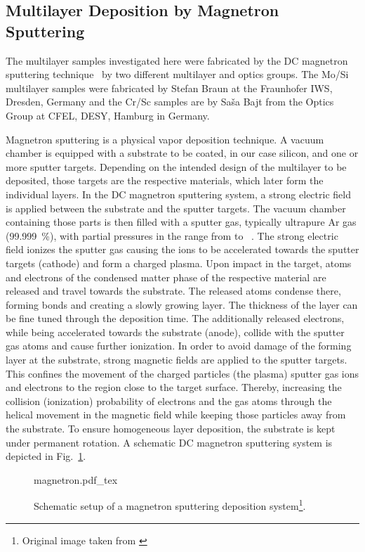 \subsection{Multilayer Deposition by Magnetron Sputtering} \label{ch_exp:sec_magnetron_sputtering}
The multilayer samples investigated here were fabricated by the DC magnetron sputtering technique~\cite{stearns_fabrication_1991} by two different multilayer and optics groups. The Mo/Si multilayer samples were fabricated by Stefan Braun at the Fraunhofer IWS, Dresden, Germany and the Cr/Sc samples are by Sa\v{s}a Bajt from the Optics Group at CFEL, DESY, Hamburg in Germany.

Magnetron sputtering is a physical vapor deposition technique. A vacuum chamber is equipped with a substrate to be coated, in our case silicon, and one or more sputter targets. Depending on the intended design of the multilayer to be deposited, those targets are the respective materials, which later form the individual layers. In the DC magnetron sputtering system, a strong electric field is applied between the substrate and the sputter targets. The vacuum chamber containing those parts is then filled with a sputter gas, typically ultrapure Ar gas (\SI{99.999}{\percent}), with partial pressures in the range from  to ~\cite{stearns_fabrication_1991}. The strong electric field ionizes the sputter gas causing the ions to be accelerated towards the sputter targets (cathode) and form a charged plasma. Upon impact in the target, atoms and electrons of the condensed matter phase of the respective material are released and travel towards the substrate. The released atoms condense there, forming bonds and creating a slowly growing layer. The thickness of the layer can be fine tuned through the deposition time. The additionally released electrons, while being accelerated towards the substrate (anode), collide with the sputter gas atoms and cause further ionization. In order to avoid damage of the forming layer at the substrate, strong magnetic fields are applied to the sputter targets. This confines the movement of the charged particles (the plasma) sputter gas ions and electrons to the region close to the target surface. Thereby, increasing the collision (ionization) probability of electrons and the gas atoms through the helical movement in the magnetic field while keeping those particles away from the substrate. To ensure homogeneous layer deposition, the substrate is kept under permanent rotation. A schematic DC magnetron sputtering system is depicted in Fig.~\ref{ch_exp:magnetron_sputtering_schematic}.
\begin{figure}[htb]
        \def\svgwidth{0.65\textwidth}
	{magnetron.pdf_tex}
        \caption[Schematic setup of a magnetron sputtering deposition system.]{%
            Schematic setup of a magnetron sputtering deposition system\footnote{Original image taken from \textcite{stearns_fabrication_1991}}.}
        \label{ch_exp:magnetron_sputtering_schematic}
\end{figure}



